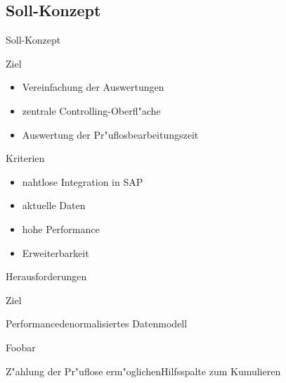 \subsection{Soll-Konzept}
\begin{frame}[<+->]{Soll-Konzept}
	\begin{block}{Ziel}
		\begin{itemize}
			\item Vereinfachung der Auswertungen 
			\item zentrale Controlling-Oberfl"ache
			\item Auswertung der Pr"uflosbearbeitungszeit 
		\end{itemize}
	\end{block}
	
	\begin{block}{Kriterien}
		\begin{itemize}
			\item nahtlose Integration in SAP
			\item aktuelle Daten
			\item hohe Performance
			\item Erweiterbarkeit
		\end{itemize}
	\end{block}
\end{frame}
\begin{frame}[<+->]{Herausforderungen}
	\begin{block}{Ziel}
		\begin{description}[otherdescription]
			\item{Performance}{denormalisiertes Datenmodell}
			\item{Foo}{bar}
			\item{Z"ahlung der Pr"uflose erm"oglichen}{Hilfsspalte zum Kumulieren}
		\end{description}
	\end{block}
\end{frame}

